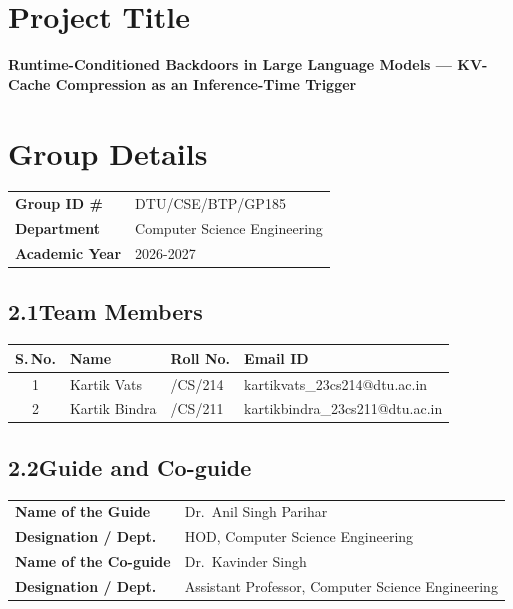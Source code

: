 \documentclass[11pt,a4paper]{article}
\begin{document}
\section{Project Title}
\textbf{\large Runtime-Conditioned Backdoors in Large Language Models --- KV-Cache Compression as an Inference-Time Trigger}

\section{Group Details}

\renewcommand{\arraystretch}{1.2}
\begin{tabularx}{\textwidth}{@{}p{4.6cm}X@{}}
\toprule
\textbf{Group ID \#} & {DTU/CSE/BTP/GP185} \\
\textbf{Department} & {Computer Science Engineering} \\
\textbf{Academic Year} & {2026-2027} \\
\bottomrule
\end{tabularx}

\subsection*{2.1\quad Team Members}
\begin{tabularx}{\textwidth}{@{}c>{\raggedright\arraybackslash}p{4.2cm}>{\raggedright\arraybackslash}p{3cm}>{\raggedright\arraybackslash}X@{}}
\toprule
\textbf{S.\,No.} & \textbf{Name} & \textbf{Roll No.} & \textbf{Email ID} \\
\midrule
1 & Kartik Vats & 23/CS/214 & kartikvats\_23cs214@dtu.ac.in\\
2 & Kartik Bindra & 23/CS/211 & kartikbindra\_23cs211@dtu.ac.in\\
\bottomrule
\end{tabularx}

\subsection*{2.2\quad Guide and Co-guide}
\begin{tabularx}{\textwidth}{@{}p{4.6cm}X@{}}
\toprule
\textbf{Name of the Guide} & {Dr.~Anil Singh Parihar} \\
\textbf{Designation / Dept.} & {HOD, Computer Science Engineering} \\
\textbf{Name of the Co-guide} & {Dr.~Kavinder Singh} \\
\textbf{Designation / Dept.} & {Assistant Professor, Computer Science Engineering} \\
\bottomrule
\end{tabularx}
\end{document}
